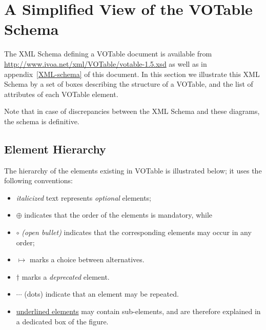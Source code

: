 \documentclass[11pt,a4paper]{ivoa}
\def\Arefx#1{appendix~\ref{#1}}
\def\order{$\oplus$ }
\def\unorder{{\large $\circ$ }}
\def\deprecated {$\dagger$ }
\def\choice{{$\mapsto$ }}
\begin{document}
{\clearpage
\section{A Simplified View of the VOTable \ivoaDocversion{} Schema}
\label{dtd}

The XML Schema defining a VOTable \ivoaDocversion{} document
is available from
\url{http://www.ivoa.net/xml/VOTable/votable-1.5.xsd}
as well as in \Arefx{XML-schema} of this document.
In this section we illustrate this XML Schema
by a set of boxes describing the structure of a VOTable,
and the list of attributes of each VOTable element.

Note that in case of discrepancies between the XML Schema and
these diagrams, the schema is definitive.

\subsection{Element Hierarchy}

The hierarchy of the elements existing in VOTable \ivoaDocversion{} is illustrated below;
it uses the following conventions:
\begin{itemize}
\item   {\em italicized} text represents {\em optional} elements;
\item   \order{} indicates that the order of the elements is mandatory, while
\item   \unorder{} {\em(open bullet)} indicates that the corresponding
        elements may occur in any order;
\item   \choice{} marks a choice between alternatives.
\item   \deprecated{} marks a {\em deprecated} element.
\item   $\cdots$ (dots) indicate that an element
        may be repeated.
\item   \underline{underlined elements} may contain sub-elements,
        and are therefore explained in a dedicated box of the figure.
\end{itemize}

\bigskip
\begin{quote}\small

\end{quote}

}
\end{document}
